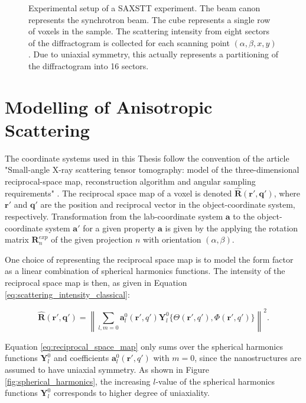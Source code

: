 \begin{figure}
    \centering
    
    \caption{Experimental setup of a SAXSTT experiment. The beam canon represents the synchrotron beam. The cube represents a single row of voxels in the sample.
        The scattering intensity from eight sectors of the diffractogram is collected for each scanning point $(\alpha, \beta,x,y)$.
        Due to uniaxial symmetry, this actually represents a partitioning of the diffractogram into 16 sectors.}
    \label{fig:experimental_setup}
\end{figure}



\section{Modelling of Anisotropic Scattering}
The coordinate systems used in this Thesis follow the convention of the article "Small-angle X-ray scattering tensor tomography:
model of the three-dimensional reciprocal-space
map, reconstruction algorithm and angular
sampling requirements" \cite{liebi2018small}.
The reciprocal space map of a voxel is denoted $\bm{\widehat{R}}(\bm{r'}, \bm{q'})$,
where $\bm{r'}$ and $\bm{q'}$ are the position and reciprocal vector in the object-coordinate system, respectively.
Transformation from the lab-coordinate system $\bm{a}$ to the object-coordinate system $\bm{a'}$ for a given property $\bm{a}$
is given by the applying the rotation matrix $\bm{R}_{n}^{exp}$ of the given projection $n$ with orientation $\left(\alpha,\beta\right)$.


One choice of representing the reciprocal space map is to model the form factor as a linear combination of spherical harmonics functions.
The intensity of the reciprocal space map is then,
as given in Equation \eqref{eq:scattering_intensity_classical}:

\begin{equation}\label{eq:reciprocal_space_map}
    \bm{\widehat{R}}(\bm{r'}, \bm{q'}) = \left\| \sum_{l, m=0} \bm{a}_{l}^{0}(\bm{r'}, q') \bm{Y}_{l}^{0} \{ \Theta(\bm{r'}, q'), \Phi(\bm{r'}, q') \} \right\|^{2}.
\end{equation}

Equation \eqref{eq:reciprocal_space_map} only sums over the spherical harmonics functions $\bm{Y}_{l}^{0}$ and coefficients $\bm{a}_{l}^{0}(\bm{r'}, q')$ with $m=0$, since the nanostructures are assumed to have uniaxial symmetry.
As shown in Figure \ref{fig:spherical_harmonics}, the increasing $l$-value of the spherical harmonics functions $\bm{Y}_{l}^{0}$ corresponds to higher degree of uniaxiality.

